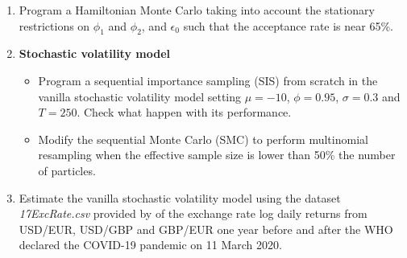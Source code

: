 \begin{enumerate}
	\item Program a Hamiltonian Monte Carlo taking into account the stationary restrictions on $\phi_1$ and $\phi_2$, and $\epsilon_0$ such that the acceptance rate is near 65\%. 
	
	\item \textbf{Stochastic volatility model}
	\begin{itemize}
		\item Program a sequential importance sampling (SIS) from scratch in the vanilla stochastic volatility model setting $\mu=-10$, $\phi = 0.95$, $\sigma=0.3$ and $T=250$. Check what happen with its performance.
		\item Modify the sequential Monte Carlo (SMC) to perform multinomial resampling when the effective sample size is lower than 50\% the number of particles.  
	\end{itemize}

	\item Estimate the vanilla stochastic volatility model using the dataset \textit{17ExcRate.csv} provided by \cite{ramirez2024testing} of the exchange rate log daily returns from USD/EUR, USD/GBP and GBP/EUR one year before and after the WHO declared the COVID-19 pandemic on 11 March 2020. 
	
	
\end{enumerate}
